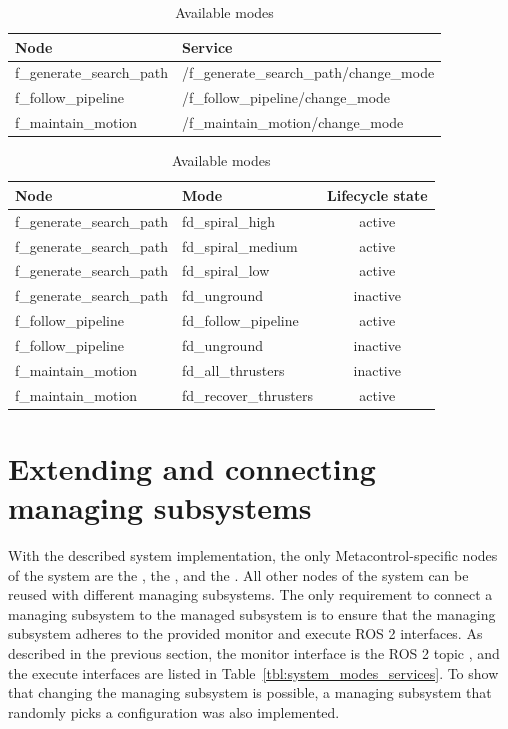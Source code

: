 \begin{table}
    \centering
    \caption{Available System Modes' services}\label{tbl:system_modes_services}
    \begin{tabular}{|p{4cm}|l|}
        \hline
        \textbf{Node} & \textbf{Service} \\
        \hline
        f\_generate\_search\_path  & /f\_generate\_search\_path/change\_mode   \\
        \hline
        f\_follow\_pipeline  & /f\_follow\_pipeline/change\_mode   \\
        \hline
        f\_maintain\_motion  & /f\_maintain\_motion/change\_mode   \\
        \hline
    \end{tabular}
    \bigskip
    \caption{Available modes}\label{tbl:system_modes_modes}
    \begin{tabular}{|p{4cm}|p{3.0cm}|c|}
        \hline
        \textbf{Node} & \textbf{Mode} & \textbf{Lifecycle state} \\
        \hline
        f\_generate\_search\_path & fd\_spiral\_high   & active               \\
        \hline
        f\_generate\_search\_path & fd\_spiral\_medium   & active             \\
        \hline
        f\_generate\_search\_path & fd\_spiral\_low   & active              \\
        \hline
        f\_generate\_search\_path & fd\_unground   & inactive  \\
        \hline
        f\_follow\_pipeline & fd\_follow\_pipeline   & active  \\
        \hline
        f\_follow\_pipeline & fd\_unground   & inactive  \\
        \hline
        f\_maintain\_motion & fd\_all\_thrusters   & inactive  \\
        \hline
        f\_maintain\_motion & fd\_recover\_thrusters   & active  \\
        \hline
    \end{tabular}
\end{table}


\section{Extending and connecting managing subsystems}\label{sec:managing_requirements}

With the described system implementation, the only Metacontrol-specific nodes of the system are the , the , and the . All other nodes of the system can be reused with different managing subsystems. The only requirement to connect a managing subsystem to the managed subsystem is to ensure that the managing subsystem adheres to the provided monitor and execute ROS 2 interfaces. As described in the previous section, the monitor interface is the ROS 2 topic , and the execute interfaces are listed in Table~\ref{tbl:system_modes_services}. To show that changing the managing subsystem is possible, a managing subsystem that randomly picks a configuration was also implemented.

